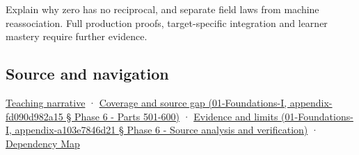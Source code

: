 Explain why zero has no reciprocal, and separate field laws from machine reassociation. Full production proofs, target-specific integration and learner mastery require further evidence.

\subsection{Source and navigation}\label{source-and-navigation}

\href{Continuous\%20Notes/Computing\%20Foundations\%20-\%20From\%20Bits\%20to\%20C++\%20and\%20Systems\%20APIs\#Numbers\%20become\%20a\%20system\%20of\%20permitted\%20operations}{Teaching narrative} · \href{}{Coverage and source gap (01-Foundations-I, appendix-fd090d982a15 § Phase 6 - Parts 501-600)} · \href{}{Evidence and limits (01-Foundations-I, appendix-a103e7846d21 § Phase 6 - Source analysis and verification)} · \hyperref[appendix-4ad47bdd269a]{Dependency Map}
